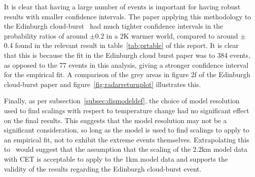 It is clear that having a large number of events is important for having robust results with smaller confidence intervals.
The paper applying this methodology to the Edinburgh cloud-burst~\cite{Tett_Soon}
    had much tighter confidence intervals in the probability ratios of around $\pm$0.2
    in a 2K warmer world, compared to around $\pm$0.4 found in the relevant result
    in table~\ref{tab:prtable} of this report.
It is clear that this is because the fit in the Edinburgh cloud burst paper was to 384 events,
    as opposed to the 77 events in this analysis,
    giving a stronger confidence interval for the empirical fit.
A comparison of the grey areas in figure 2f of the Edinburgh cloud-burst paper and figure~\ref{fig:radarreturnplot} illustrates this.

Finally, as per subsection~\ref{subsec:dismodeldef},
    the choice of model resolution used to find scalings with respect to temperature change
    had no significant effect on the final results.
This suggests that the model resolution may not be a significant consideration,
    so long as the model is used to find scalings to apply to an empirical fit,
    not to exhibit the extreme events themselves.
Extrapolating this to~\cite{Tett_Soon} would suggest that the assumption that the
    scaling of the 2.2km model data with CET is acceptable to apply to the 1km model data and supports the validity of the results regarding the Edinburgh cloud-burst event.